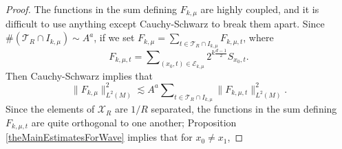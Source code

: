 \begin{proof}
\begin{comment}
    \item For $l > 2(\mu - \mu')$, if $(x_1,t_1) \in \mathcal{H}_{x_0,t_0,l}$, then $x_1$ lies in a geodesic annulus with thickness $O(u^a/R)$ and radius $\gtrsim l u^a / R$, centered at $x_0$. Thus $\mathcal{H}_{x_0,t_0,l}$ is covered by $O(l^{d-1})$ balls of radius $u^a / R$. The density properties of $\mathcal{E}_k$ imply that
    \[ \# \mathcal{H}_{x_0,t_0,l} \lesssim (Ru) l^{d-1} (u^a/R) = u^{a+1} l^{d-1}. \]
    Together with Lemma \ref{mainOrthogonalityLemma}, we conclude that
    \[ \sum_{(x_1,t_1) \in \mathcal{H}_{x_0,t_0,l}} |\langle {S\!}_{x_0,t_0}, {S\!}_{x_1,t_1} \rangle| \lesssim_M (u^{a+1} l^{d-1}) (l u^a)^{-M}. \]
    Picking $M \gtrsim d$ and summing over $l > 2 (\mu - \mu')$, $\mu' \leq \mu - 10$, and $(x_0,t_0) \in \mathcal{E}_{k,\mu}$ gives that
    \[ \sum_{(x_0,t_0) \in \mathcal{E}_{k,\mu}} \sum_{\mu' \leq \mu - 10} \sum_{(\mu - \mu')/2 \leq l} \sum_{(x_1,t_1) \in \mathcal{H}_{x_0,t_0,l}} |\langle {S\!}_{x_0,t_0}, {S\!}_{x_1,t_1} \rangle| \lesssim \# \mathcal{E}_{k,\mu}. \]
\end{itemize}
%
Thus we have, using that $\mu \lesssim 2^k / u^a$, we conclude that
%
\begin{align*}
    \| F_k \|_{L^2(M)}^2 &\lesssim \sum_\mu \| F_{k,\mu} \|_{L^2(M)}^2 + \sum_\mu \left( 1 + u^{1 - a \left( \frac{d-3}{2} \right)} \mu^{\frac{d+1}{2}} \right) \# \mathcal{E}_{k,\mu}\\
    &= \sum_\mu \| F_{k,\mu} \|_{L^2(M)}^2 + \left( 1 + 2^{k \frac{d+1}{2}} u^{1 - a (d-1)} \right) \# \mathcal{E}_k.
\end{align*}
%
\end{comment}
The functions in the sum defining $F_{k,\mu}$ are highly coupled, and it is difficult to use anything except Cauchy-Schwarz to break them apart. Since $\# ( \mathcal{T}_R \cap I_{k,\mu}) \sim A^a$, if we set $F_{k,\mu} = \sum_{t \in \mathcal{T}_R \cap I_{k,\mu}} F_{k,\mu,t}$, where
%
\begin{equation}
    F_{k,\mu,t} = \sum\nolimits_{(x_0,t) \in \mathcal{E}_{k,\mu}} 2^{k \frac{d-1}{2}} {S\!}_{x_0,t}.
\end{equation}
%
Then Cauchy-Schwarz implies that
%
\begin{equation} \label{IOJDAOIWDJAWOIJF}
    \| F_{k,\mu} \|_{L^2(M)}^2 \lesssim A^a \sum\nolimits_{t \in \mathcal{T}_R \cap I_{k,\mu}} \| F_{k,\mu,t} \|_{L^2(M)}^2.
\end{equation}
%
Since the elements of $\mathcal{X}_R$ are $1/R$ separated, the functions in the sum defining $F_{k,\mu,t}$ are quite orthogonal to one another; Proposition \ref{theMainEstimatesForWave} implies that for $x_0 \neq x_1$,

\end{proof}
